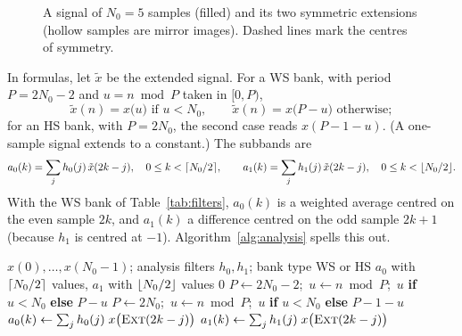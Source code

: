 \begin{figure}[ht]
  \centering
  
  \caption{A signal of $N_0 = 5$ samples (filled) and its two symmetric extensions (hollow
  samples are mirror images). Dashed lines mark the centres of symmetry.}
  \label{fig:extension}
\end{figure}

In formulas, let $\tilde x$ be the extended signal. For a WS bank, with period $P = 2N_0-2$
and $u = n \bmod P$ taken in $[0, P)$,
\begin{equation}
  \tilde x(n) = x\bigl(u\bigr) \text{ if } u < N_0, \qquad \tilde x(n) = x\bigl(P-u\bigr) \text{ otherwise};
  \label{eq:wsext}
\end{equation}
for an HS bank, with $P = 2N_0$, the second case reads $x(P-1-u)$. (A one-sample signal
extends to a constant.) The subbands are
\begin{equation}
  a_0(k) = \sum_j h_0(j)\,\tilde x(2k-j), \quad 0 \le k < \lceil N_0/2 \rceil, \qquad
  a_1(k) = \sum_j h_1(j)\,\tilde x(2k-j), \quad 0 \le k < \lfloor N_0/2 \rfloor.
  \label{eq:analysis}
\end{equation}
With the WS bank of Table~\ref{tab:filters}, $a_0(k)$ is a weighted average centred on the
even sample $2k$, and $a_1(k)$ a difference centred on the odd sample $2k+1$ (because $h_1$ is
centred at $-1$). Algorithm~\ref{alg:analysis} spells this out.

\begin{algorithm}[ht]
  \caption{One-dimensional symmetric wavelet analysis.}
  \label{alg:analysis}
  \begin{algorithmic}[1]
    \Require $x(0),\dots,x(N_0-1)$; analysis filters $h_0, h_1$; bank type WS or HS
    \Ensure $a_0$ with $\lceil N_0/2 \rceil$ values, $a_1$ with $\lfloor N_0/2 \rfloor$ values
     
       \Return $0$ \EndIf
       \State $P \gets 2N_0 - 2$;\ $u \gets n \bmod P$;\ \Return $u$ \textbf{if} $u < N_0$ \textbf{else} $P - u$
      \Else \State $P \gets 2N_0$;\ $u \gets n \bmod P$;\ \Return $u$ \textbf{if} $u < N_0$ \textbf{else} $P - 1 - u$
      \EndIf
    \EndFunction
      \State $a_0(k) \gets \sum_{j} h_0(j)\; x\bigl(\Call{Ext}{2k - j}\bigr)$ 
    \EndFor
      \State $a_1(k) \gets \sum_{j} h_1(j)\; x\bigl(\Call{Ext}{2k - j}\bigr)$
    \EndFor
  \end{algorithmic}
\end{algorithm}

